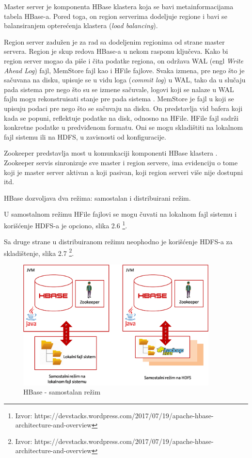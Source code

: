 \documentclass[12pt,oneside]{memoir}
\begin{document}
Master server  je komponenta HBase klastera koja se bavi metainformacijama tabela HBase-a. Pored toga, on region serverima dodeljuje regione i bavi se balansiranjem opterećenja klastera (\textit{load balancing}).

Region server zadužen je za rad sa dodeljenim regionima od strane master servera. Region je skup redova HBase-a u nekom rasponu ključeva. Kako bi region server mogao da piše i čita podatke regiona, on održava WAL (engl \textit{Write Ahead Log}) fajl, MemStore fajl kao i HFile fajlove. Svaka izmena, pre nego što je sačuvana na disku, upisuje se u vidu loga (\textit{commit log}) u WAL, tako da u slučaju pada sistema pre nego što su se izmene sačuvale, logovi koji se nalaze u WAL fajlu mogu rekonstruisati stanje pre pada sistema \cite{wal}. MemStore je fajl u koji se upisuju podaci pre nego što se sačuvaju na disku. On predstavlja vid bafera koji kada se popuni, reflektuje podatke na disk, odnosno na HFile. HFile fajl sadrži konkretne podatke u predviđenom formatu. Oni se mogu skladištiti na lokalnom fajl sistemu ili na HDFS, u zavisnosti od konfiguracije.

Zookeeper predstavlja most u komunkaciji komponenti HBase klastera \cite{zookeeper}. Zookeeper servis  sinronizuje sve master i region servere, ima evidenciju o tome koji je master server aktivan a koji pasivan, koji region serveri više nije dostupni itd.

HBase dozvoljava dva režima: samostalan i distribuirani režim.

U samostalnom režimu HFile fajlovi se mogu čuvati na lokalnom fajl sistemu i korišćenje HDFS-a je opciono, slika 2.6  \footnote{Izvor: https://devstacks.wordpress.com/2017/07/19/apache-hbase-architecture-and-overview}.

Sa druge strane u distribuiranom režimu neophodno je korišćenje HDFS-a za skladištenje, slika 2.7 \footnote{Izvor: https://devstacks.wordpress.com/2017/07/19/apache-hbase-architecture-and-overview}. 

\begin{figure}[!ht]
  \centering
  \includegraphics[width=0.9\textwidth]{hbase-standalone.png}
  \caption{HBase - samostalan režim }
  \label{fig:grafikon}
\end{figure}
\end{document}
